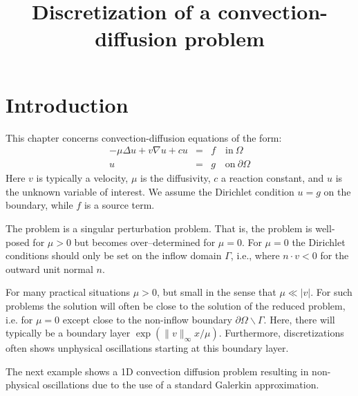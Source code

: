 \documentclass[a4paper,11pt]{amsart}
\title{Discretization of a convection-diffusion problem}
\begin{document}
\maketitle

\section{Introduction}
This chapter concerns convection-diffusion equations of the form: 
\begin{eqnarray*}
-\mu\Delta u + v\nabla u + c u  &=& f \quad \textrm{in}\ \Omega\\
u&=& g \quad \textrm{on}\ \partial\Omega
\end{eqnarray*}
Here $v$ is  typically a velocity, $\mu$ is the diffusivity, $c$ 
a reaction constant, and $u$ is the 
unknown variable of interest. We assume the Dirichlet condition $u=g$ on 
the boundary, while $f$ is a source term.  

The problem is a singular perturbation problem. That is, the problem is well-posed for $\mu > 0$ but becomes over--determined for $\mu=0$. For $\mu=0$ the Dirichlet conditions should only be set on the inflow domain $\Gamma$, i.e., where $n \cdot v < 0$ for the outward unit normal $n$. 

For many practical situations $\mu>0$, but small in the sense that $\mu \ll |v|$. For such problems the solution 
will often be close to the solution of the reduced problem, i.e. for $\mu=0$ except close to the 
non-inflow boundary $\partial \Omega \backslash \Gamma$. Here, there will typically be a boundary layer $\exp{(\|v\|_\infty x / \mu)}$.      
Furthermore, discretizations often shows unphysical oscillations starting at this boundary layer.    

The next example shows a 1D convection diffusion problem resulting in non-physical oscillations due to the use
of a standard Galerkin approximation. 
\end{document}

